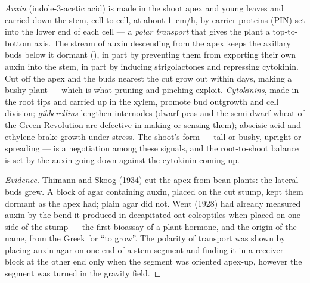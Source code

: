 \begin{proposition}\label{prop:b2:plant-meristems:apical}
\emph{Auxin} (indole-3-acetic acid) is made in the shoot apex and
young leaves and carried down the stem, cell to cell, at about
\qty{1}{cm/h}, by carrier proteins (PIN) set into the lower end of
each cell --- a \emph{polar transport} that gives the plant a
top-to-bottom axis. The stream of auxin descending from the apex
keeps the axillary buds below it dormant (\emph{}),
in part by preventing them from exporting their own auxin into the
stem, in part by inducing strigolactones and repressing cytokinin.
Cut off the apex and the buds nearest the cut grow out within days,
making a bushy plant --- which is what pruning and pinching exploit.
\emph{Cytokinins}, made in the root tips and carried up in the xylem,
promote bud outgrowth and cell division; \emph{gibberellins}
lengthen internodes (dwarf peas and the semi-dwarf wheat of the
Green Revolution are defective in making or sensing them); abscisic
acid and ethylene brake growth under stress. The shoot's form ---
tall or bushy, upright or spreading --- is a negotiation among
these signals, and the root-to-shoot balance is set by the auxin
going down against the cytokinin coming up.
\end{proposition}
\begin{proof}[Evidence]
Thimann and Skoog (1934) cut the apex from bean plants: the lateral
buds grew. A block of agar containing auxin, placed on the cut
stump, kept them dormant as the apex had; plain agar did not. Went
(1928) had already measured auxin by the bend it produced in
decapitated oat coleoptiles when placed on one side of the stump ---
the first bioassay of a plant hormone, and the origin of the name,
from the Greek for ``to grow''. The polarity of transport was shown
by placing auxin agar on one end of a stem segment and finding it
in a receiver block at the other end only when the segment was
oriented apex-up, however the segment was turned in the gravity
field.
\end{proof}

